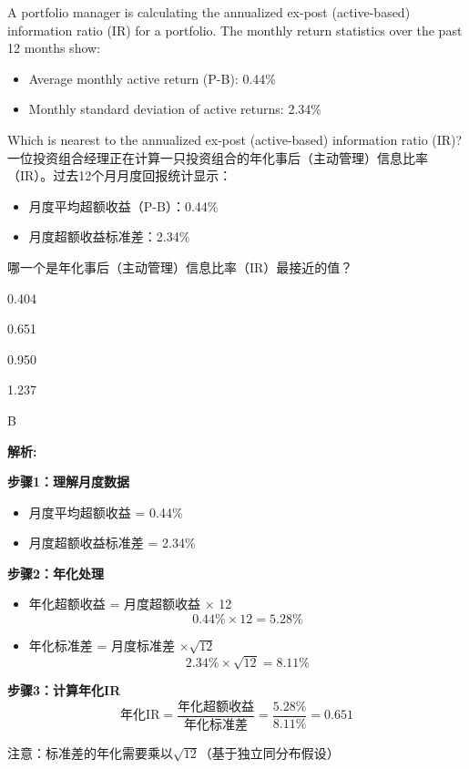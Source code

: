 \documentclass{article}
\newcounter{question} %
\newenvironment{explanation}
{\textbf{解析:}\par}
{\par}
\begin{document}
\begin{question}
    A portfolio manager is calculating the annualized ex-post (active-based) information ratio (IR) for a portfolio. The monthly return statistics over the past 12 months show:

    \begin{itemize}
        \item Average monthly active return (P-B): 0.44\%
        \item Monthly standard deviation of active returns: 2.34\%
    \end{itemize}

    Which is nearest to the annualized ex-post (active-based) information ratio (IR)?
    \\    一位投资组合经理正在计算一只投资组合的年化事后（主动管理）信息比率（IR）。过去12个月月度回报统计显示：
    \begin{itemize}
        \item 月度平均超额收益（P-B）：0.44\%
        \item 月度超额收益标准差：2.34\%
    \end{itemize}
    哪一个是年化事后（主动管理）信息比率（IR）最接近的值？

\end{question}

\begin{choices}
    \item 0.404
    \item 0.651
    \item 0.950
    \item 1.237
\end{choices}

\begin{correctanswer}
    B
\end{correctanswer}

\begin{explanation}
    \textbf{步骤1：理解月度数据}
    \begin{itemize}
        \item 月度平均超额收益 = 0.44\%
        \item 月度超额收益标准差 = 2.34\%
    \end{itemize}

    \textbf{步骤2：年化处理}
    \begin{itemize}
        \item 年化超额收益 = 月度超额收益 $\times$ 12
            \[ 0.44\% \times 12 = 5.28\% \]
        \item 年化标准差 = 月度标准差 $\times \sqrt{12}$
            \[ 2.34\% \times \sqrt{12} = 8.11\% \]
    \end{itemize}

    \textbf{步骤3：计算年化IR}
    \[
    \text{年化IR} = \frac{\text{年化超额收益}}{\text{年化标准差}} = \frac{5.28\%}{8.11\%} = 0.651
    \]

    注意：标准差的年化需要乘以$\sqrt{12}$（基于独立同分布假设）

\end{explanation}
\end{document}
